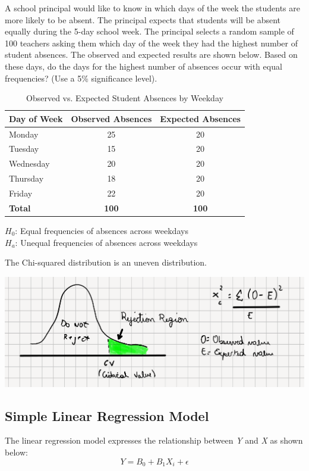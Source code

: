 \documentclass[12pt]{book}
\theoremstyle{definition}
\begin{document}
A school principal would like to know in which days of the week the students are more likely to be absent. The principal expects that students will be absent equally during the 5-day school week. The principal selects a random sample of 100 teachers asking them which day of the week they had the highest number of student absences. The observed and expected results are shown below. Based on these days, do the days for the highest number of absences occur with equal frequencies? (Use a 5\% significance level).

\begin{table}[h]
    \centering
    \caption{Observed vs. Expected Student Absences by Weekday}
    \begin{tabular}{|l|c|c|}
    \hline
    \textbf{Day of Week} & \textbf{Observed Absences} & \textbf{Expected Absences} \\ \hline
    Monday    & 25 & 20 \\ \hline
    Tuesday   & 15 & 20 \\ \hline
    Wednesday & 20 & 20 \\ \hline
    Thursday  & 18 & 20 \\ \hline
    Friday    & 22 & 20 \\ \hline
    \textbf{Total} & \textbf{100} & \textbf{100} \\ \hline
    \end{tabular}
    \label{tab:absences}
    
    \smallskip
    $H_0$: Equal frequencies of absences across weekdays \\
    $H_a$: Unequal frequencies of absences across weekdays
\end{table}

The Chi-squared distribution is an uneven distribution.

\begin{center}
    \includegraphics[scale=0.4]{./assets/chi-squared.png}
\end{center}


\subsection{Simple Linear Regression Model}
The linear regression model expresses the relationship between \textit{Y} and \textit{X} as shown below:
\begin{equation}
    Y = B_0 + B_1X_i + \epsilon
\end{equation}
\end{document}
